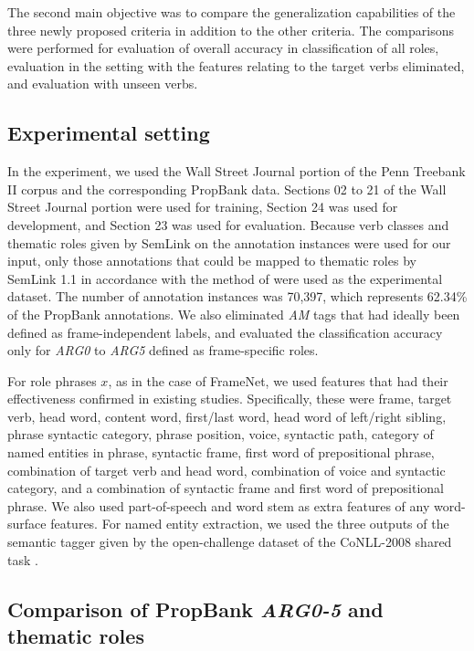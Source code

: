 \documentclass[english]{jnlp_1.4_rep}
\begin{document}
The second main objective was to compare the generalization capabilities of the three newly proposed criteria in addition to the other criteria. The comparisons were performed for evaluation of overall accuracy in classification of all roles, evaluation in the setting with the features relating to the target verbs eliminated, and evaluation with unseen verbs.


\subsection{Experimental setting}
\label{sec:propbank-setting}

In the experiment, we used the Wall Street Journal portion of the Penn Treebank II corpus and the corresponding PropBank data. Sections 02 to 21 of the Wall Street Journal portion were used for training, Section 24 was used for development, and Section 23 was used for evaluation. Because verb classes and thematic roles given by SemLink on the annotation instances were used for our input, only those annotations that could be mapped to thematic roles by SemLink 1.1 in accordance with the method of  were used as the experimental dataset. The number of annotation instances was 70,397, which represents 62.34\% of the PropBank annotations. We also eliminated {\it AM} tags that had ideally been defined as frame-independent labels, and evaluated the classification accuracy only for {\it ARG0} to {\it ARG5} defined as frame-specific roles.

For role phrases $x$, as in the case of FrameNet, we used features that had their effectiveness confirmed in existing studies. Specifically, these were frame, target verb, head word, content word, first/last word, head word of left/right sibling, phrase syntactic category, phrase position, voice, syntactic path, category of named entities in phrase, syntactic frame, first word of prepositional phrase, combination of target verb and head word, combination of voice and syntactic category, and a combination of syntactic frame and first word of prepositional phrase.  We also used part-of-speech and word stem as extra features of any word-surface features. For named entity extraction, we used the three outputs of the semantic tagger \cite{ciaramita2006bcs} given by the open-challenge dataset of the CoNLL-2008 shared task \cite{surdeanu2008cst}.


\subsection{Comparison of PropBank {\itshape ARG0-5} and thematic roles}
\label{sec:pbVsTr}
\end{document}

